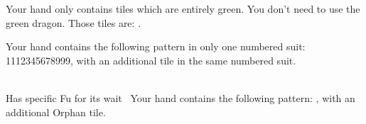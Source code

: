 	{}
	{Your hand only contains tiles which are entirely green. You don't need to use the green dragon. Those tiles are: {}.}

	{\closedhand}
	{Your hand contains the following pattern in only one numbered suit: 1112345678999, with an additional tile in the same numbered suit.}

	{\closedhand \\
	\upgradestoother Has specific Fu for its wait~}
	{Your hand contains the following pattern: {}, with an additional Orphan tile.}

